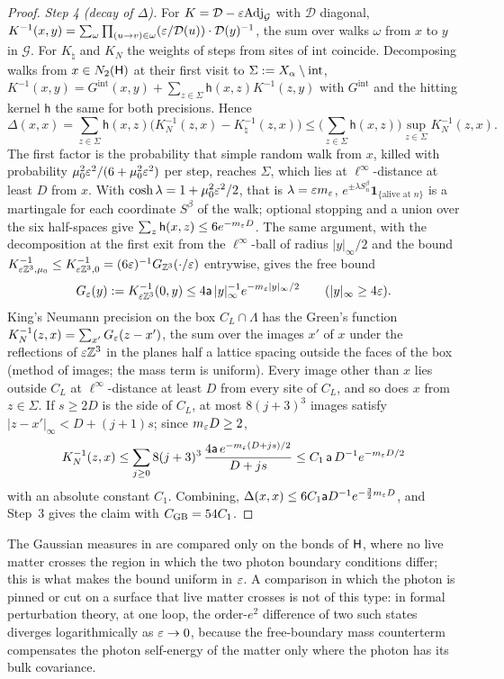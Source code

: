 \begin{proof}
\emph{Step 4 (decay of $\Delta$).} For $K=\mathcal D-\varepsilon\mathrm{Adj}_{\mathcal G}$ with $\mathcal D$ diagonal, $K^{-1}(x,y)=\sum_\omega\prod_{(u\to v)\in\omega}(\varepsilon/\mathcal D(u))\cdot\mathcal D(y)^{-1}$, the sum over walks $\omega$ from $x$ to $y$ in $\mathcal G$. For $K_\natural$ and $K_N$ the weights of steps from sites of $\mathrm{int}$ coincide. Decomposing walks from $x\in N_{2}(\mathsf H)$ at their first visit to $\Sigma:= X_\alpha\setminus\mathrm{int}$, $K^{-1}(x,y)=G^{\mathrm{int}}(x,y)+\sum_{z\in\Sigma}\mathsf h(x,z)K^{-1}(z,y)$ with $G^{\mathrm{int}}$ and the hitting kernel $\mathsf h$ the same for both precisions. Hence
\[
\Delta(x,x)=\sum_{z\in\Sigma}\mathsf h(x,z)\big(K_N^{-1}(z,x)-K_\natural^{-1}(z,x)\big)\le\Big(\sum_{z\in\Sigma}\mathsf h(x,z)\Big)\sup_{z\in\Sigma}K_N^{-1}(z,x).
\]
The first factor is the probability that simple random walk from $x$, killed with probability $\mu_0^2\varepsilon^2/(6+\mu_0^2\varepsilon^2)$ per step, reaches $\Sigma$, which lies at $\ell^\infty$-distance at least $D$ from $x$. With $\cosh\lambda=1+\mu_0^2\varepsilon^2/2$, that is $\lambda=\varepsilon m_{\varepsilon}$, $e^{\pm\lambda S^\beta_n}\mathbf 1_{\{\text{alive at }n\}}$ is a martingale for each coordinate $S^\beta$ of the walk; optional stopping and a union over the six half-spaces give $\sum_z\mathsf h(x,z)\le6e^{-m_{\varepsilon} D}$. The same argument, with the decomposition at the first exit from the $\ell^\infty$-ball of radius $|y|_\infty/2$ and the bound $K^{-1}_{\varepsilon\mathbb Z^3,\mu_0}\le K^{-1}_{\varepsilon\mathbb Z^3,0}=(6\varepsilon)^{-1}G_{\mathbb Z^3}(\cdot/\varepsilon)$ entrywise, gives the free bound
\[
G_{\varepsilon}(y):= K^{-1}_{\varepsilon\mathbb Z^3}(0,y)\le4\mathsf a\,|y|_\infty^{-1}e^{-m_{\varepsilon}|y|_\infty/2}\qquad(|y|_\infty\ge4\varepsilon).
\]
King's Neumann precision on the box $C_L\cap\Lambda$ has the Green's function $K_N^{-1}(z,x)=\sum_{x'}G_{\varepsilon}(z-x')$, the sum over the images $x'$ of $x$ under the reflections of $\varepsilon\mathbb Z^3$ in the planes half a lattice spacing outside the faces of the box (method of images; the mass term is uniform). Every image other than $x$ lies outside $C_L$ at $\ell^\infty$-distance at least $D$ from every site of $C_L$, and so does $x$ from $z\in\Sigma$. If $s\ge2D$ is the side of $C_L$, at most $8(j+3)^3$ images satisfy $|z-x'|_\infty<D+(j+1)s$; since $m_{\varepsilon} D\ge2$,
\[
K_N^{-1}(z,x)\le\sum_{j\ge0}8(j+3)^3\,\frac{4\mathsf a\,e^{-m_{\varepsilon}(D+js)/2}}{D+js}\le C_1\,\mathsf a\,D^{-1}e^{-m_{\varepsilon} D/2}
\]
with an absolute constant $C_1$. Combining, $\Delta(x,x)\le6C_1\mathsf a D^{-1}e^{-\frac32m_{\varepsilon} D}$, and Step~3 gives the claim with $C_{\rm GB}=54C_1$.
\end{proof}

The Gaussian measures in  are compared only on the bonds of $\mathsf H$, where no live matter crosses the region in which the two photon boundary conditions differ; this is what makes the bound uniform in $\varepsilon$. A comparison in which the photon is pinned or cut on a surface that live matter crosses is not of this type: in formal perturbation theory, at one loop, the order-$e^2$ difference of two such states diverges logarithmically as $\varepsilon\to0$, because the free-boundary mass counterterm compensates the photon self-energy of the matter only where the photon has its bulk covariance.


